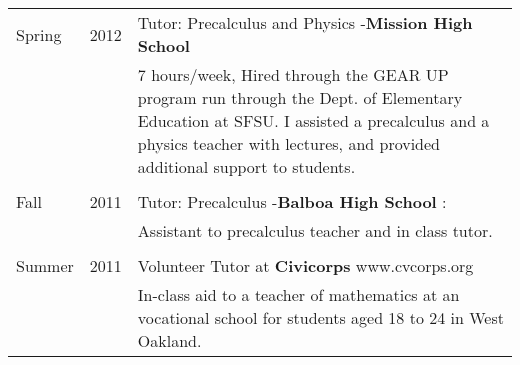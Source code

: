 \documentclass[margin,line,pifont,palatino,courier]{res}
\begin{document}
\begin{resume}
\begin{tabular}{@{}p{0.75in}p{0.5in}p{4in}}
Spring & 2012 & Tutor:  Precalculus and Physics -{\bf  Mission High School}\\

  &    &    7 hours/week, Hired through the GEAR UP program run through the Dept. of Elementary Education at SFSU.  I assisted a precalculus and a physics teacher with lectures, and provided additional support to students.  \\
  \\
Fall & 2011 &  Tutor: Precalculus  -{\bf Balboa High School}  :\\

& &  Assistant to precalculus teacher and in class tutor. \\ \\

Summer & 2011 & Volunteer Tutor at {\bf Civicorps} www.cvcorps.org  \\	

& & 		In-class aid to a teacher of mathematics at an vocational school for students aged 18 to 24 in West Oakland.\\


\end{tabular}
\end{resume}
\end{document}
